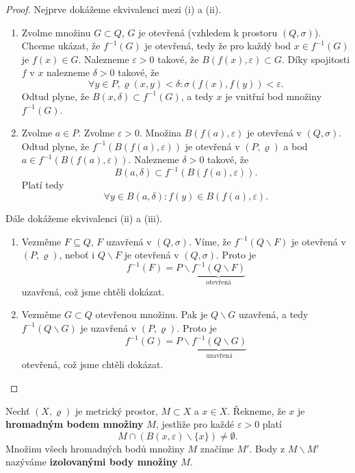 \begin{proof}
	Nejprve dokážeme ekvivalenci mezi (i) a (ii).
	\begin{enumerate}
		\item[$\implies$] Zvolme množinu $G\subset Q$, $G$ je otevřená (vzhledem k prostoru $(Q,\sigma)$).
		Chceme ukázat, že $f^{-1}(G)$ je otevřená, tedy že pro každý bod $x \in f^{-1}(G)$ je $f(x)\in G$.
		Nalezneme $\varepsilon>0$ takové, že $B(f(x),\varepsilon)\subset G$. Díky spojitosti $f$
		v $x$ nalezneme $\delta > 0$ takové, že
		$$
		    \forall y \in P, \varrho(x,y)<\delta: \sigma(f(x),f(y))<\varepsilon.
		$$
		Odtud plyne, že $B(x,\delta)\subset f^{-1}(G)$, a tedy $x$ je vnitřní bod množiny $f^{-1}(G)$.
	    \item[$\impliedby$] Zvolme $a \in P$. Zvolme $\varepsilon>0$. Množina $B(f(a),\varepsilon)$ je
		otevřená v $(Q,\sigma)$. Odtud plyne, že $f^{-1}(B(f(a),\varepsilon))$ je otevřená
		v $(P,\varrho)$ a bod $a \in f^{-1}(B(f(a),\varepsilon))$. Nalezneme $\delta>0$ takové, že
		$$
		B(a,\delta)\subset f^{-1}(B(f(a),\varepsilon)).
		$$
		Platí tedy
		$$
		    \forall y \in B(a,\delta):f(y)\in B(f(a),\varepsilon).
		$$
	\end{enumerate}
	Dále dokážeme ekvivalenci (ii) a (iii).
	\begin{enumerate}
		\item[$\implies$] Vezměme $F \subseteq Q$, $F$ uzavřená v $(Q,\sigma)$. Víme, že
		$f^{-1}(Q\smallsetminus F)$ je otevřená v $(P,\varrho)$, neboť i $Q\smallsetminus F$ je otevřená v $(Q,\sigma)$.
		Proto je
		$$f^{-1}(F)=P\smallsetminus \underbrace{f^{-1}(Q\smallsetminus F)}_{\text{otevřená}}$$
		uzavřená, což jsme chtěli dokázat.
		\item[$\impliedby$] Vezměme $G \subset Q$ otevřenou množinu. Pak je $Q\smallsetminus G$ uzavřená, a
	    tedy $f^{-1}(Q\smallsetminus G)$ je uzavřená v $(P,\varrho)$. Proto je
		$$
			 f^{-1}(G)=P\smallsetminus \underbrace{f^{-1}(Q\smallsetminus G)}_{\text{uzavřená}}
		$$
		otevřená, což jsme chtěli dokázat. \qedhere
\end{enumerate}
\end{proof}

\begin{definice}
Nechť $(X,\varrho)$ je metrický prostor, $M\subset X$ a $x\in X$. Řekneme, že $x$ je \textbf{hromadným bodem množiny} $M$, jestliže pro každé $\varepsilon>0$ platí
\[
M\cap (B(x,\varepsilon)\smallsetminus\{x\})\neq\emptyset.
\]
Množinu všech hromadných bodů množiny $M$ značíme $M'$.
Body z $M\smallsetminus M'$ nazýváme \textbf{izolovanými body množiny} $M$.
\end{definice}

